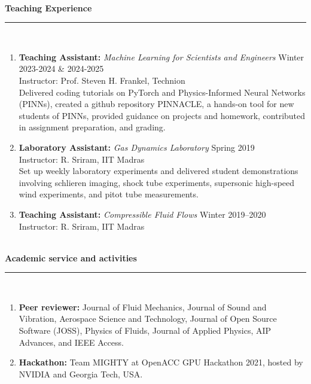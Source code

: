 \ \\[2mm]
\noindent \textbf{\large{Teaching Experience}}\\[-2.5mm]
\noindent\rule{\textwidth}{0.4pt} \\[-5mm]

\begin{enumerate}[itemsep=-1mm]
    \item \textbf{Teaching Assistant:} \textit{Machine Learning for Scientists and Engineers} \hfill Winter 2023-2024 \& 2024-2025 \\
          Instructor: Prof. Steven H. Frankel, Technion \\
          Delivered coding tutorials on PyTorch and Physics-Informed Neural Networks (PINNs), created a github repository PINNACLE, a hands-on tool for new students of PINNs, provided guidance on projects and homework, contributed in assignment preparation, and grading.

    \item \textbf{Laboratory Assistant:} \textit{Gas Dynamics Laboratory} \hfill Spring 2019 \\
          Instructor: R. Sriram, IIT Madras \\
          Set up weekly laboratory experiments and delivered student demonstrations involving schlieren imaging, shock tube experiments, supersonic high-speed wind experiments, and pitot tube measurements.

    \item \textbf{Teaching Assistant:} \textit{Compressible Fluid Flows} \hfill Winter 2019–2020 \\
          Instructor: R. Sriram, IIT Madras
\end{enumerate}

\ \\[2mm]
\noindent \textbf{\large{Academic service and activities}}\\[-2.5mm]
\noindent\rule{\textwidth}{0.4pt} \\[-5mm]
\begin{enumerate}[itemsep=-1mm]
    \item \textbf{Peer reviewer:} Journal of Fluid Mechanics, Journal of Sound and Vibration, Aerospace Science and Technology, Journal of Open Source Software (JOSS), Physics of Fluids, Journal of Applied Physics, AIP Advances, and IEEE Access.
    \item \textbf{Hackathon:} Team MIGHTY at OpenACC GPU Hackathon 2021, hosted by NVIDIA and Georgia Tech, USA.
\end{enumerate}

